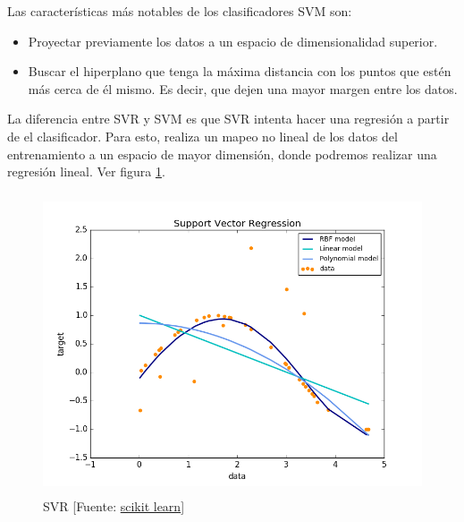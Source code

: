 	Las características más notables de los clasificadores SVM son:
	\begin{itemize}
		\item Proyectar previamente los datos a un espacio de dimensionalidad superior.
		\item Buscar el hiperplano que tenga la máxima distancia con los puntos que estén más cerca de él mismo. Es decir, que dejen una mayor margen entre los datos.
	\end{itemize}

	La diferencia entre SVR y SVM es que SVR intenta hacer una regresión a partir de el clasificador. Para esto, realiza un mapeo no lineal de los datos del entrenamiento a un espacio de mayor dimensión, donde podremos realizar una regresión lineal. Ver figura \ref{svr}.

	\begin{figure}[htb]
		\begin{center}
			\includegraphics[height=3.5in]{figures/svr.png}
			\caption{SVR [Fuente: \href{http://scikit-learn.org/stable/auto_examples/svm/plot_svm_regression.html}{scikit learn}] }
		\end{center}
		\label{svr}
	\end{figure}
	
